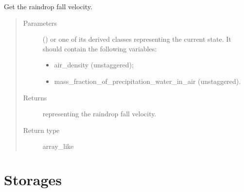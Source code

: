 \documentclass[letterpaper,10pt,english]{sphinxmanual}
\begin{document}
\begin{fulllineitems}
\begin{fulllineitems}
\label{\detokenize{api:tasmania.parameterizations.slow_tendency_microphysics_kessler_wrf_saturation.SlowTendencyMicrophysicsKesslerWRFSaturation.get_raindrop_fall_velocity}}
Get the raindrop fall velocity.
\begin{quote}\begin{description}
\item[{Parameters}] \leavevmode
{} () \textendash{} 
{\hyperref[\detokenize{api:tasmania.storages.grid_data.GridData}]{}} or one of its derived classes representing the current state.
It should contain the following variables:
\begin{itemize}
\item {} 
air\_density (unstaggered);

\item {} 
mass\_fraction\_of\_precipitation\_water\_in\_air (unstaggered).

\end{itemize}


\item[{Returns}] \leavevmode
{} representing the raindrop fall velocity.

\item[{Return type}] \leavevmode
array\_like

\end{description}\end{quote}

\end{fulllineitems}


\end{fulllineitems}



\section{Storages}
\label{\detokenize{api:storages}}
\end{document}
